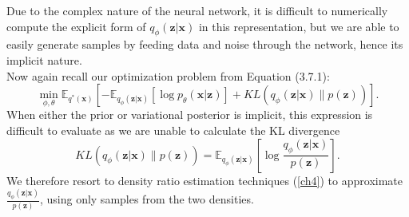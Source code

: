 \documentclass[honours,12pt]{unswthesis}
\newcommand{\E}{\mathbb{E}}
\numberwithin{equation}{section}
\theoremstyle{definition}
\begin{document}
Due to the complex nature of the neural network, it is difficult to numerically compute the explicit form of $q_\phi(\bm{z}|\bm{x})$ in this representation, but we are able to easily generate samples by feeding data and noise through the network, hence its implicit nature.\\
Now again recall our optimization problem from Equation (3.7.1):
\[\min_{\phi,\theta} \mathbb{E}_{q^*(\bm{x})}\left[-\E_{q_\phi(\bm{z}|\bm{x})}[\log p_\theta(\bm{x}|\bm{z})]+KL(q_\phi(\bm{z}|\bm{x})\|p(\bm{z}))\right].\]
When either the prior or variational posterior is implicit, this expression is difficult to evaluate as we are unable to calculate the KL divergence 
\[KL(q_\phi(\bm{z}|\bm{x})\|p(\bm{z}))=\E_{q_\phi(\bm{z}|\bm{x})}\left[\log \frac{q_\phi(\bm{z}|\bm{x})}{p(\bm{z})}\right].\]
We therefore resort to density ratio estimation techniques (\autoref{ch4}) to approximate $\frac{q_\phi(\bm{z}|\bm{x})}{p(\bm{z})}$, using only samples from the two densities.
\end{document}

